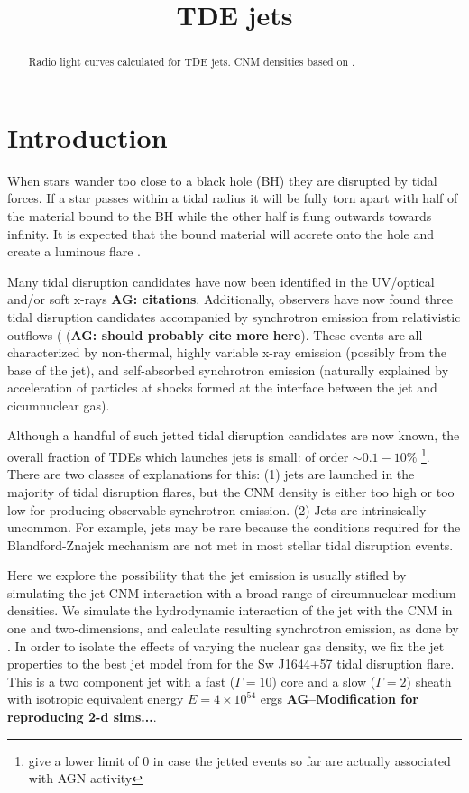 \documentclass[usenatbib,fleqn]{mn2e}
\title{TDE jets}
\begin{document}
\begin{abstract}
  Radio light curves calculated for TDE jets. CNM
  densities based on \citet{Generozov+2015}. 
\end{abstract}
\section{Introduction}
\label{sec:intro}
When stars wander too close to a black hole (BH) they are disrupted by
tidal forces. If a star passes within a tidal radius it will be fully
torn apart with half of the material bound to the BH while the
other half is flung outwards towards infinity. It is expected that the
bound material will accrete onto the hole and create a luminous flare
\citep{Hills1975, Carter+1982, Rees1988}. 

Many tidal disruption candidates have now been identified in the
UV/optical and/or soft x-rays {\bf AG: citations}. Additionally,
observers have now found three tidal disruption candidates accompanied
by synchrotron emission from relativistic outflows
(\citealt{Bloom+2011, Zauderer+2011, Cenko+2012, Brown+2015} ({\bf AG:
  should probably cite more here}). These events are all characterized
by non-thermal, highly variable x-ray emission (possibly from the base
of the jet), and self-absorbed synchrotron emission (naturally
explained by acceleration of particles at shocks formed at the
interface between the jet and cicumnuclear gas).

Although a handful of such jetted tidal disruption candidates are
now known, the overall fraction of TDEs which launches jets is small:
of order $\sim 0.1-10\%$
\citep{van-Velzen+2013}\footnote{\citet{van-Velzen+2013} give a lower
  limit of 0 in case the jetted events so far are actually associated
  with AGN activity}.  There are two classes of explanations for this:
(1) jets are launched in the majority of tidal disruption flares, but
the CNM density is either too high or too low for producing observable
synchrotron emission. (2) Jets are intrinsically uncommon. For
example, jets may be rare because the conditions required for the
Blandford-Znajek mechanism are not met in most stellar tidal
disruption events.

Here we explore the possibility that the jet emission is usually
stifled by simulating the jet-CNM interaction with a broad range of
circumnuclear medium densities. We simulate the hydrodynamic
interaction of the jet with the CNM in one and two-dimensions, and
calculate resulting synchrotron emission, as done by
\citet{Mimica+2015}. In order to isolate the effects of varying the
nuclear gas density, we fix the jet properties to the best jet model
from \citet{Mimica+2015} for the Sw J1644+57 tidal disruption flare.
This is a two component jet with a fast ($\Gamma=10$) core and a slow
($\Gamma=2$) sheath with isotropic equivalent energy $E=4 \times
10^{54}$ ergs {\bf AG--Modification for reproducing 2-d sims...}.
\end{document}
